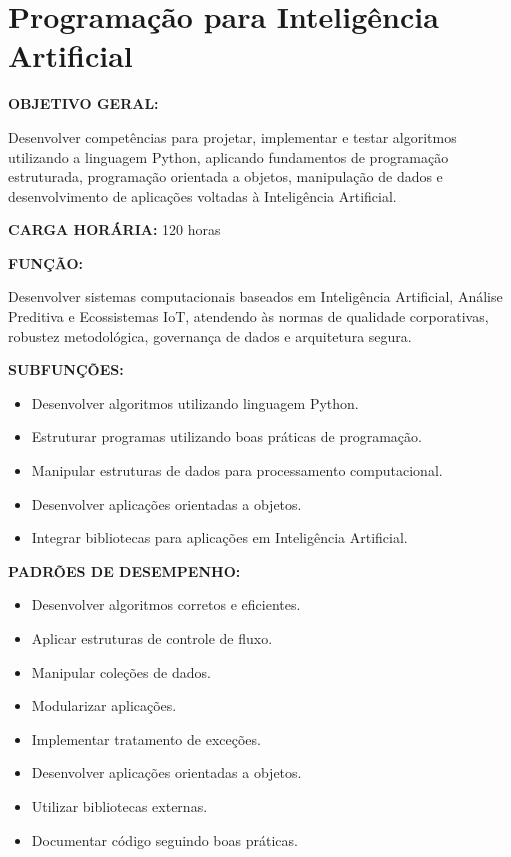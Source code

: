 \section{Programação para Inteligência Artificial}

\textbf{OBJETIVO GERAL:}

Desenvolver competências para projetar, implementar e testar algoritmos utilizando a linguagem Python, aplicando fundamentos de programação estruturada, programação orientada a objetos, manipulação de dados e desenvolvimento de aplicações voltadas à Inteligência Artificial.

\textbf{CARGA HORÁRIA:} 120 horas

\textbf{FUNÇÃO:}

Desenvolver sistemas computacionais baseados em Inteligência Artificial, Análise Preditiva e Ecossistemas IoT, atendendo às normas de qualidade corporativas, robustez metodológica, governança de dados e arquitetura segura.

\textbf{SUBFUNÇÕES:}

\begin{itemize}
\item Desenvolver algoritmos utilizando linguagem Python.
\item Estruturar programas utilizando boas práticas de programação.
\item Manipular estruturas de dados para processamento computacional.
\item Desenvolver aplicações orientadas a objetos.
\item Integrar bibliotecas para aplicações em Inteligência Artificial.
\end{itemize}

\textbf{PADRÕES DE DESEMPENHO:}

\begin{itemize}
\item Desenvolver algoritmos corretos e eficientes.
\item Aplicar estruturas de controle de fluxo.
\item Manipular coleções de dados.
\item Modularizar aplicações.
\item Implementar tratamento de exceções.
\item Desenvolver aplicações orientadas a objetos.
\item Utilizar bibliotecas externas.
\item Documentar código seguindo boas práticas.
\end{itemize}


